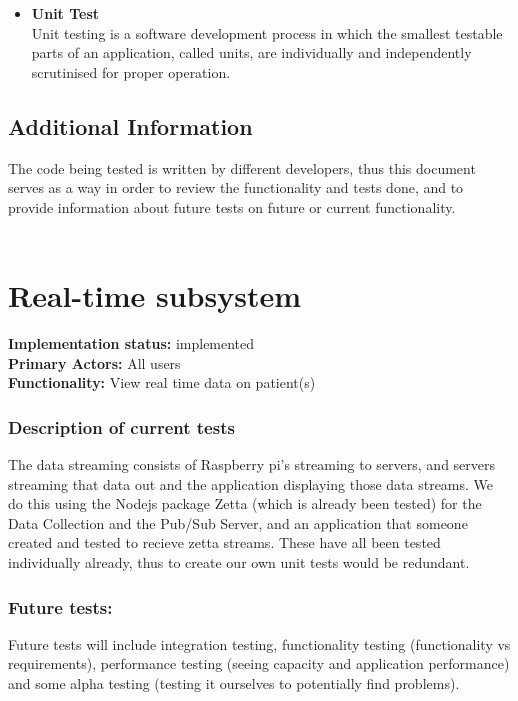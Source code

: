 \documentclass[12pt]{article}
\begin{document}
{			\begin{itemize}

				\item \textbf{Unit Test}\\
				\newline
				Unit testing is a software development process in which the smallest testable parts of an application, called units, are individually and independently scrutinised for proper operation.\\

			\end{itemize}

		\subsection{Additional Information}

		The code being tested is written by different developers, thus this document serves as a way in order to review the functionality and tests done, and to provide information about future tests on future or current functionality.\\\\


	\pagebreak

	\section{Real-time subsystem}
	\textbf{Implementation status:} implemented \\
	\textbf{Primary Actors:} All users \\
	\textbf{Functionality:} View real time data on patient(s)\\
	\subsubsection{Description of current tests}
	The data streaming consists of Raspberry pi's streaming to servers, and servers streaming that data out and the application displaying those data streams. We do this using the Nodejs package Zetta (which is already been tested) for the Data Collection and the Pub/Sub Server, and an application that someone created and tested to recieve zetta streams. These have all been tested individually already, thus to create our own unit tests would be redundant.
	\subsubsection{Future tests:}
	Future tests will include integration testing, functionality testing (functionality vs requirements), performance testing (seeing capacity and application performance) and some alpha testing (testing it ourselves to potentially find problems).
}
\end{document}
